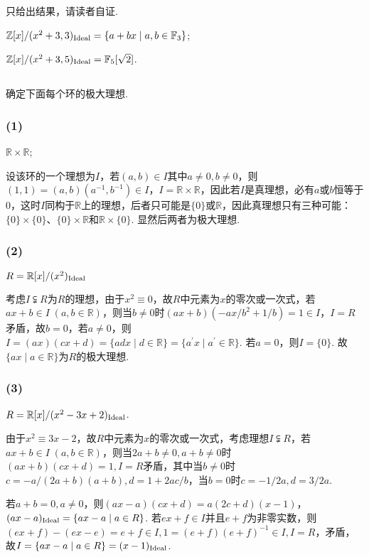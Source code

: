 \jie 只给出结果，请读者自证.

$\mathbb{Z}[x]/(x^2+3,3)_{\operatorname{Ideal}}=\{a+bx\mid a,b\in\mathbb{F}_3\}$;

$\mathbb{Z}[x]/(x^2+3,5)_{\operatorname{Ideal}}=\mathbb{F}_5[\sqrt{2}]$.

\subsection{}
确定下面每个环的极大理想.
\subsubsection{(1)}
$\mathbb{R}\times\mathbb{R}$;

\jie 设该环的一个理想为$I$，若$(a,b)\in I$其中$a\neq 0, b\neq 0$，则$(1,1)=(a,b)(a^{-1},b^{-1})\in I$，$I=\mathbb{R}\times\mathbb{R}$，因此若$I$是真理想，必有$a$或$b$恒等于$0$，这时$I$同构于$\mathbb{R}$上的理想，后者只可能是$\{0\}$或$\mathbb{R}$，因此真理想只有三种可能：$\{0\}\times\{0\}$、$\{0\}\times\mathbb{R}$和$\mathbb{R}\times\{0\}$. 显然后两者为极大理想.

\subsubsection{(2)}
$R=\mathbb{R}[x]/(x^2)_{\operatorname{Ideal}}$

\jie 考虑$I\subsetneqq R$为$R$的理想，由于$x^2\equiv 0$，故$R$中元素为$x$的零次或一次式，若$ax+b\in I\;(a,b\in\mathbb{R})$，则当$b\neq 0$时$(ax+b)(-ax/b^2+1/b)=1\in I$，$I=R$矛盾，故$b=0$，若$a\neq 0$，则$I=(ax)(cx+d)=\{adx\mid d\in \mathbb{R}\}=\{a^{\prime}x\mid a^{\prime}\in\mathbb{R}\}$. 若$a=0$，则$I=\{0\}$. 故$\{ax\mid a\in\mathbb{R}\}$为$R$的极大理想.

\subsubsection{(3)}
$R=\mathbb{R}[x]/(x^2-3x+2)_{\operatorname{Ideal}}$.

\jie 由于$x^2\equiv 3x-2$，故$R$中元素为$x$的零次或一次式，考虑理想$I\subsetneqq R$，若$ax+b\in I\;(a,b\in\mathbb{R})$，则当$2a+b\neq 0, a+b\neq 0$时$(ax+b)(cx+d)=1, I=R$矛盾，其中当$b\neq 0$时$c=-a/(2a+b)(a+b), d=1+2ac/b$，当$b=0$时$c=-1/2a, d=3/2a$.

若$a+b=0, a\neq 0$，则$(ax-a)(cx+d)=a(2c+d)(x-1)$，$(ax-a)_{\operatorname{Ideal}}=\{ax-a\mid a\in R\}$. 若$ex+f\in I$并且$e+f$为非零实数，则$(ex+f)-(ex-e)=e+f\in I, 1=(e+f)(e+f)^{-1}\in I, I=R$，矛盾，故$I=\{ax-a\mid a\in R\}=(x-1)_{\operatorname{Ideal}}$.

